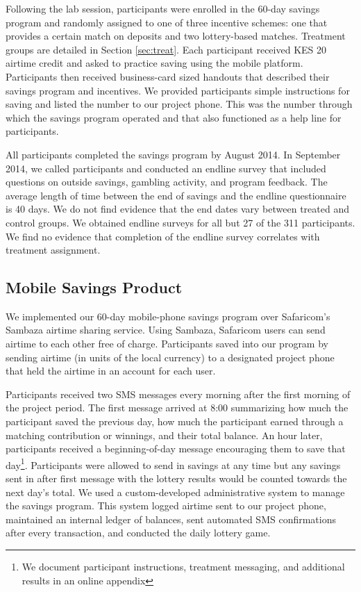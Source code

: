 \documentclass[11pt]{article}
\begin{document}
		Following the lab session, participants were enrolled in the 60-day savings program and randomly assigned to one of three incentive schemes: one that provides a certain match on deposits and two lottery-based matches. Treatment groups are detailed in Section \ref{sec:treat}. Each participant received KES 20 airtime credit and asked to practice saving using the mobile platform. Participants then received business-card sized handouts that described their savings program and incentives. We provided participants simple instructions for saving and listed the number to our project phone. This was the number through which the savings program operated and that also functioned as a help line for participants.

		All participants completed the savings program by August 2014. In September 2014, we called participants and conducted an endline survey that included questions on outside savings, gambling activity, and program feedback. The average length of time between the end of savings and the endline questionnaire is 40 days. We do not find evidence that the end dates vary between treated and control groups. We obtained endline surveys for all but 27 of the 311 participants. We find no evidence that completion of the endline survey correlates with treatment assignment.

		\clearpage

	\subsection{Mobile Savings Product}

		We implemented our 60-day mobile-phone savings program over Safaricom's Sambaza airtime sharing service. Using Sambaza, Safaricom users can send airtime to each other free of charge. Participants saved into our program by sending airtime (in units of the local currency) to a designated project phone that held the airtime in an account for each user.

		Participants received two SMS messages every morning after the first morning of the project period. The first message arrived at 8:00 summarizing how much the participant saved the previous day, how much the participant earned through a matching contribution or winnings, and their total balance. An hour later, participants received a beginning-of-day message encouraging them to save that day\footnote{We document participant instructions, treatment messaging, and additional results in an online appendix}. Participants were allowed to send in savings at any time but any savings sent in after first message with the lottery results would be counted towards the next day's total. We used a custom-developed administrative system to manage the savings program. This system logged airtime sent to our project phone, maintained an internal ledger of balances, sent automated SMS confirmations after every transaction, and conducted the daily lottery game.
\end{document}

